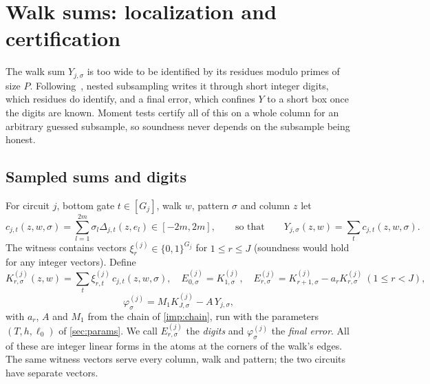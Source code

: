 \documentclass[11pt,letterpaper]{article}
\theoremstyle{definition}
\theoremstyle{remark}
\begin{document}
\section{Walk sums: localization and certification}\label{sec:walks}

The walk sum \(Y_{j,\sigma}\) is too wide to be identified by its
residues modulo primes of size \(P\). Following~\cite[Section~5]{NagCG},
nested subsampling writes it through short integer digits, which
residues do identify, and a final error, which confines \(Y\) to a short
box once the digits are known. Moment tests certify all of this on a
whole column for an arbitrary guessed subsample, so soundness never
depends on the subsample being honest.

\subsection{Sampled sums and digits}
For circuit \(j\), bottom gate \(t\in[G_j]\), walk \(w\), pattern
\(\sigma\) and column \(z\) let
\[
 c_{j,t}(z,w,\sigma)=\sum_{l=1}^{2m}\sigma_l\Delta_{j,t}(z,e_l)\in[-2m,2m],
 \qquad\text{so that}\qquad Y_{j,\sigma}(z,w)=\sum_tc_{j,t}(z,w,\sigma).
\]
The witness contains vectors \(\xi^{(j)}_r\in\{0,1\}^{G_j}\) for
\(1\le r\le J\) (soundness would hold for any integer vectors).
Define
\[
 K^{(j)}_{r,\sigma}(z,w)=\sum_t\xi^{(j)}_{r,t}\,c_{j,t}(z,w,\sigma),\quad
 E^{(j)}_{0,\sigma}=K^{(j)}_{1,\sigma},\quad
 E^{(j)}_{r,\sigma}=K^{(j)}_{r+1,\sigma}-a_rK^{(j)}_{r,\sigma}\ (1\le r<J),
\]
\[
 \varphi^{(j)}_\sigma=M_1K^{(j)}_{J,\sigma}-A\,Y_{j,\sigma},
\]
with \(a_r\), \(A\) and \(M_1\) from the chain of \cref{imp:chain},
run with the parameters \((T,h,\ell_0)\) of \cref{sec:params}. We call
\(E^{(j)}_{r,\sigma}\) the \emph{digits} and \(\varphi^{(j)}_\sigma\) the
\emph{final error}. All of these are integer linear forms in the atoms
at the corners of the walk's edges. The same witness vectors serve
every column, walk and pattern; the two circuits have separate
vectors.
\end{document}
